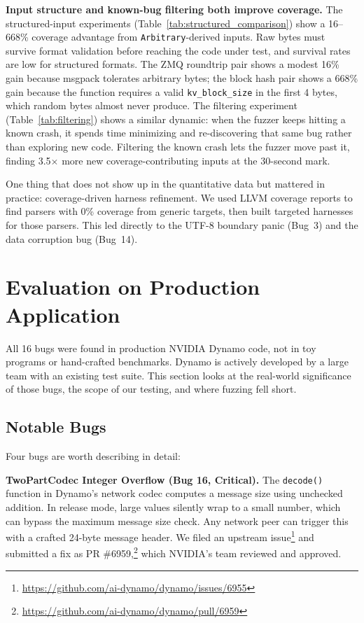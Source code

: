 \documentclass[11pt]{article}
\begin{document}
\textbf{Input structure and known-bug filtering both improve coverage.} The structured-input experiments (Table~\ref{tab:structured_comparison}) show a 16--668\% coverage advantage from \texttt{Arbitrary}-derived inputs. Raw bytes must survive format validation before reaching the code under test, and survival rates are low for structured formats. The ZMQ roundtrip pair shows a modest 16\% gain because msgpack tolerates arbitrary bytes; the block hash pair shows a 668\% gain because the function requires a valid \texttt{kv\_block\_size} in the first 4 bytes, which random bytes almost never produce. The filtering experiment (Table~\ref{tab:filtering}) shows a similar dynamic: when the fuzzer keeps hitting a known crash, it spends time minimizing and re-discovering that same bug rather than exploring new code. Filtering the known crash lets the fuzzer move past it, finding 3.5$\times$ more new coverage-contributing inputs at the 30-second mark.

One thing that does not show up in the quantitative data but mattered in practice: coverage-driven harness refinement. We used LLVM coverage reports to find parsers with 0\% coverage from generic targets, then built targeted harnesses for those parsers. This led directly to the UTF-8 boundary panic (Bug~3) and the data corruption bug (Bug~14).

\section{Evaluation on Production Application}

All 16 bugs were found in production NVIDIA Dynamo code, not in toy programs or hand-crafted benchmarks. Dynamo is actively developed by a large team with an existing test suite. This section looks at the real-world significance of those bugs, the scope of our testing, and where fuzzing fell short.

\subsection{Notable Bugs}

Four bugs are worth describing in detail:

\textbf{TwoPartCodec Integer Overflow (Bug 16, Critical).} The \texttt{decode()} function in Dynamo's network codec computes a message size using unchecked addition. In release mode, large values silently wrap to a small number, which can bypass the maximum message size check. Any network peer can trigger this with a crafted 24-byte message header. We filed an upstream issue\footnote{\url{https://github.com/ai-dynamo/dynamo/issues/6955}} and submitted a fix as PR \#6959,\footnote{\url{https://github.com/ai-dynamo/dynamo/pull/6959}} which NVIDIA's team reviewed and approved.
\end{document}
